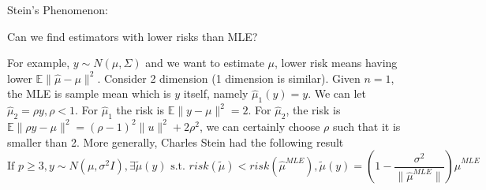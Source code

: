 \documentclass[12pt]{article}
\theoremstyle{plain}
\begin{document}
 
Stein's Phenomenon: 

Can we find estimators with lower risks than MLE? 

For example, $y \sim N(\mu, \Sigma)$ and we want to estimate $\mu$, 
lower risk means having lower $\mathbb{E}\|\hat{\mu}-\mu\|^2$.
Consider 2 dimension (1 dimension is similar). 
Given $n=1$, the MLE is sample mean which is $y$ itself, namely $\hat{\mu}_1(y)=y$.
We can let $\hat{\mu}_2 = \rho y, \rho < 1$. 
For $\hat{\mu}_1$ the risk is $\mathbb{E}\|y-\mu\|^2=2$. 
For $\hat{\mu}_2 $, the risk is $\mathbb{E}\|\rho y-\mu\|^2= (\rho -1)^2 \|u\|^2 + 2\rho^2$, we can certainly choose $\rho$ such that it is smaller than 2. More generally, Charles Stein had the following result\\
$$\text{If  } p \geq 3, y \sim N(\mu, \sigma^2 I), \exists \tilde{\mu}(y) \text{  s.t.  } risk(\tilde{\mu}) < risk(\hat{\mu}^{MLE}), \tilde{\mu}(y) = (1-\frac{\sigma^2}{\|\hat{\mu}^{MLE}\|})\hat{\mu}^{MLE}$$
\end{document}
